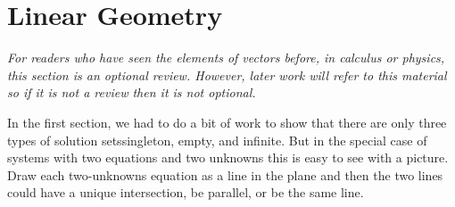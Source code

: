 \section{Linear Geometry}
\textit{For readers who have seen the elements of vectors before,
in calculus or physics, this section is an optional review.
However, later work will refer to this material
so if it is not a review then it is not optional.}

In the first section, we had to do a bit of work to show
that there are only three types of solution sets\Dash singleton, empty, and
infinite.
But in the special case of systems with two equations and two unknowns
this is easy to see with a picture.
Draw each two-unknowns equation as a line in the plane and then
the two lines could have a unique intersection, 
be parallel, or be the same line.
